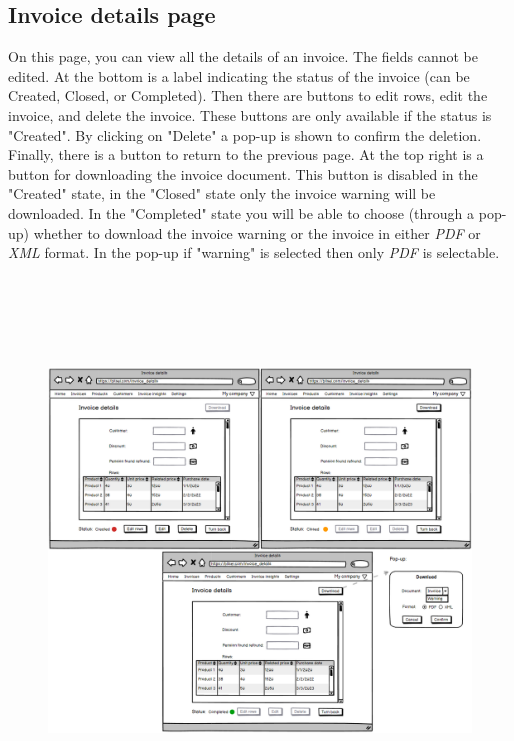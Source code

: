 \newpage
\subsection{Invoice details page}
On this page, you can view all the details of an invoice. The fields cannot be edited. At the bottom is a label indicating the status of the invoice (can be Created, Closed, or Completed). Then there are buttons to edit rows, edit the invoice, and delete the invoice. These buttons are only available if the status is "Created". By clicking on "Delete" a pop-up is shown to confirm the deletion. Finally, there is a button to return to the previous page.
At the top right is a button for downloading the invoice document. This button is disabled in the "Created" state, in the "Closed" state only the invoice warning will be downloaded. In the "Completed" state you will be able to choose (through a pop-up) whether to download the invoice warning or the invoice in either \textit{PDF} or \textit{XML} format. In the pop-up if "warning" is selected then only \textit{PDF} is selectable.
\begin{figure}[h!]
    \centering
    \includegraphics[height=410pt, keepaspectratio]{resources/mockup/Invoice_details.png}
\end{figure}


